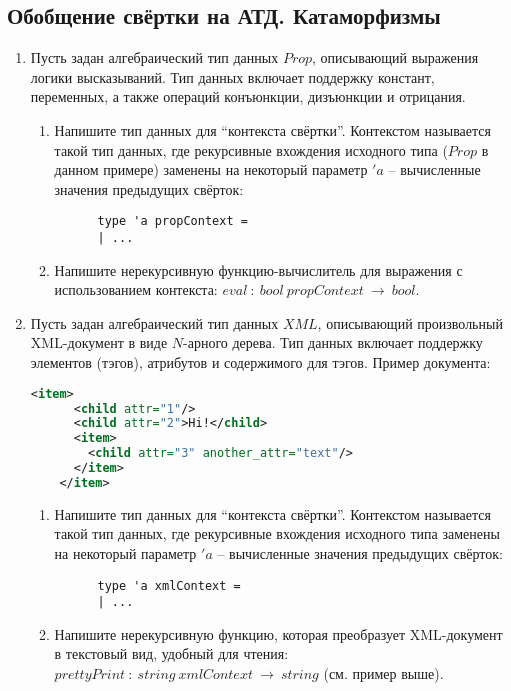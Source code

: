 \documentclass[a4paper,11pt]{article}
\newcommand{\<}{\langle}
\renewcommand{\>}{\rangle}
\begin{document}
\subsection*{Обобщение свёртки на АТД. Катаморфизмы}
\begin{enumerate}
\item Пусть задан алгебраический тип данных $Prop$, описывающий выражения логики
  высказываний. Тип данных включает поддержку констант, переменных, а также
  операций конъюнкции, дизъюнкции и отрицания.
  \begin{enumerate}
  \item Напишите тип данных для ``контекста свёртки''. Контекстом называется
    такой тип данных, где рекурсивные вхождения исходного типа ($Prop$ в данном
    примере) заменены на некоторый параметр $'\!a$ -- вычисленные значения
    предыдущих свёрток:
    \begin{lstlisting}
      type 'a propContext =
      | ...
    \end{lstlisting}
  \item Напишите нерекурсивную функцию-вычислитель для выражения с 
    использованием контекста: $eval~:~bool~propContext~\rightarrow~bool$.
  \end{enumerate}

\item Пусть задан алгебраический тип данных $XML$, описывающий произвольный 
  XML-документ в виде $N$-арного дерева. Тип данных включает поддержку 
  элементов (тэгов), атрибутов и содержимого для тэгов. Пример документа:
  \begin{lstlisting}[language=XML]
    <item>
      <child attr="1"/>
      <child attr="2">Hi!</child>
      <item>
        <child attr="3" another_attr="text"/>
      </item>
    </item>
  \end{lstlisting}
  \begin{enumerate}
  \item Напишите тип данных для ``контекста свёртки''. Контекстом называется
    такой тип данных, где рекурсивные вхождения исходного типа заменены на
    некоторый параметр $'\!a$ -- вычисленные значения предыдущих свёрток:
    \begin{lstlisting}
      type 'a xmlContext =
      | ...
    \end{lstlisting}
  \item Напишите нерекурсивную функцию, которая преобразует XML-документ
    в текстовый вид, удобный для чтения:\\
    $prettyPrint~:~string~xmlContext~\rightarrow~string$
    (см. пример выше).
  \end{enumerate}
\end{enumerate}
\end{document}
